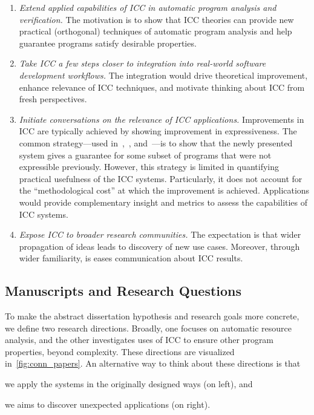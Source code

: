 \begin{enumerate}[label={\textbf{G\arabic*.}}]

\item\emph{Extend applied capabilities of ICC in automatic program analysis
and verification.}
The motivation is to show that ICC theories can provide new practical
(orthogonal) techniques of automatic program analysis and help guarantee
programs satisfy desirable properties.

\item\emph{Take ICC a few steps closer to integration into real-world software
development workflows.}
The integration would drive theoretical improvement, enhance relevance of ICC
techniques, and motivate thinking about ICC from fresh perspectives.

\item \emph{Initiate conversations on the relevance of ICC applications.}
Improvements in ICC are typically achieved by showing improvement in
expressiveness. The common strategy---used \eg
in~\cite[p.16--17]{hainry2023},~\cite[p. 17]{jones2009}, and~\cite[p.
147]{feree2018}---is to show that the newly presented system gives a guarantee
for some subset of programs that were not expressible previously. However, this
strategy is limited in quantifying practical usefulness of the ICC systems.
Particularly, it does not account for the \enquote{methodological cost} at which
the improvement is achieved. Applications would provide complementary insight
and metrics to assess the capabilities of ICC systems.

\item \emph{Expose ICC to broader research communities.}
The expectation is that wider propagation of ideas leads to discovery of new use
cases. Moreover, through wider familiarity, is eases communication about ICC
results.

\end{enumerate}

\subsection{Manuscripts and Research Questions}
\label{subsec:conn-papers}

To make the abstract dissertation hypothesis and research goals more concrete,
we define two research directions. Broadly, one focuses on automatic resource
analysis, and the other investigates uses of ICC to ensure other program
properties, beyond complexity. These directions are visualized
in~\autoref{fig:conn_papers}. An alternative way to think about these directions
is that
\begin{enumerate*}
\item we apply the systems in the originally designed ways (on left), and
\item we aims to discover unexpected applications (on right).
\end{enumerate*}

